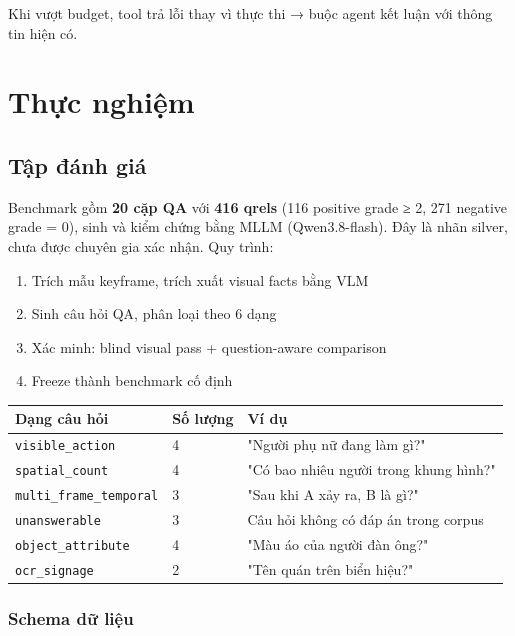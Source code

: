 \documentclass[12pt,a4paper,onecolumn]{article}
\begin{document}
Khi vượt budget, tool trả lỗi thay vì thực thi → buộc agent kết luận với thông tin hiện có.

\section{Thực nghiệm}

\subsection{Tập đánh giá}

Benchmark gồm \textbf{20 cặp QA} với \textbf{416 qrels} (116 positive grade ≥ 2, 271 negative grade = 0), sinh và kiểm chứng bằng MLLM (Qwen3.8-flash). Đây là nhãn silver, chưa được chuyên gia xác nhận. Quy trình:

\begin{enumerate}
  \item Trích mẫu keyframe, trích xuất visual facts bằng VLM
  \item Sinh câu hỏi QA, phân loại theo 6 dạng
  \item Xác minh: blind visual pass + question-aware comparison
  \item Freeze thành benchmark cố định
\end{enumerate}


\begin{center}
\begin{tabular}{l l l}
\toprule
Dạng câu hỏi & Số lượng & Ví dụ \\
\midrule
\texttt{visible\_action} & 4 & "Người phụ nữ đang làm gì?" \\
\texttt{spatial\_count} & 4 & "Có bao nhiêu người trong khung hình?" \\
\texttt{multi\_frame\_temporal} & 3 & "Sau khi A xảy ra, B là gì?" \\
\texttt{unanswerable} & 3 & Câu hỏi không có đáp án trong corpus \\
\texttt{object\_attribute} & 4 & "Màu áo của người đàn ông?" \\
\texttt{ocr\_signage} & 2 & "Tên quán trên biển hiệu?" \\
\bottomrule
\end{tabular}
\end{center}


\subsubsection{Schema dữ liệu}
\end{document}
